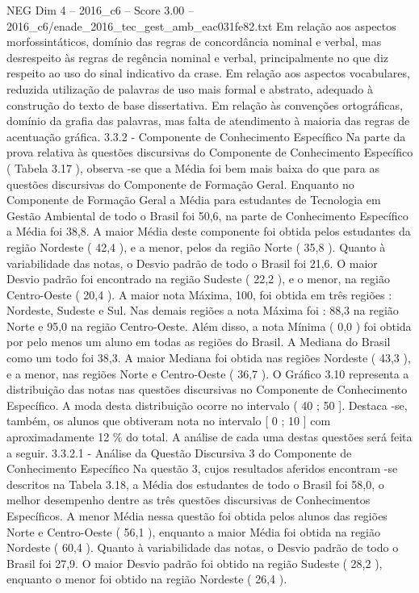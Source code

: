 \begin{textsample}{NEG Dim 4 – 2016\_c6 – Score 3.00 – 2016\_c6/enade\_2016\_tec\_gest\_amb\_eac031fe82.txt}
Em relação aos aspectos morfossintáticos, domínio das regras de concordância nominal e verbal, mas desrespeito às regras de regência nominal e verbal, principalmente no que diz respeito ao uso do sinal indicativo da crase.
Em relação aos aspectos vocabulares, reduzida utilização de palavras de uso mais formal e abstrato, adequado à construção do texto de base dissertativa.
Em relação às convenções ortográficas, domínio da grafia das palavras, mas falta de atendimento à maioria das regras de acentuação gráfica. 3.3.2 - Componente de Conhecimento Específico Na parte da prova relativa às questões discursivas do Componente de Conhecimento Específico ( Tabela 3.17 ), observa -se que a Média foi bem mais baixa do que para as questões discursivas do Componente de Formação Geral.
Enquanto no Componente de Formação Geral a Média para estudantes de Tecnologia em Gestão Ambiental de todo o Brasil foi 50,6, na parte de Conhecimento Específico a Média foi 38,8.
A maior Média deste componente foi obtida pelos estudantes da região Nordeste ( 42,4 ), e a menor, pelos da região Norte ( 35,8 ).
Quanto à variabilidade das notas, o Desvio padrão de todo o Brasil foi 21,6.
O maior Desvio padrão foi encontrado na região Sudeste ( 22,2 ), e o menor, na região Centro-Oeste ( 20,4 ).
A maior nota Máxima, 100, foi obtida em três regiões : Nordeste, Sudeste e Sul.
Nas demais regiões a nota Máxima foi : 88,3 na região Norte e 95,0 na região Centro-Oeste.
Além disso, a nota Mínima ( 0,0 ) foi obtida por pelo menos um aluno em todas as regiões do Brasil.
A Mediana do Brasil como um todo foi 38,3.
A maior Mediana foi obtida nas regiões Nordeste ( 43,3 ), e a menor, nas regiões Norte e Centro-Oeste ( 36,7 ).
O Gráfico 3.10 representa a distribuição das notas nas questões discursivas no Componente de Conhecimento Específico.
A moda desta distribuição ocorre no intervalo ( 40 ; 50 ].
Destaca -se, também, os alunos que obtiveram nota no intervalo [ 0 ; 10 ] com aproximadamente 12 \% do total.
A análise de cada uma destas questões será feita a seguir. 3.3.2.1 - Análise da Questão Discursiva 3 do Componente de Conhecimento Específico Na questão 3, cujos resultados aferidos encontram -se descritos na Tabela 3.18, a Média dos estudantes de todo o Brasil foi 58,0, o melhor desempenho dentre as três questões discursivas de Conhecimentos Específicos.
A menor Média nessa questão foi obtida pelos alunos das regiões Norte e Centro-Oeste ( 56,1 ), enquanto a maior Média foi obtida na região Nordeste ( 60,4 ).
Quanto à variabilidade das notas, o Desvio padrão de todo o Brasil foi 27,9.
O maior Desvio padrão foi obtido na região Sudeste ( 28,2 ), enquanto o menor foi obtido na região Nordeste ( 26,4 ).

\end{textsample}

